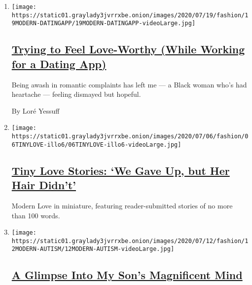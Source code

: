 \begin{enumerate}
\def\labelenumi{\arabic{enumi}.}
\item
  \texttt{[image: https://static01.graylady3jvrrxbe.onion/images/2020/07/19/fashion/19MODERN-DATINGAPP/19MODERN-DATINGAPP-videoLarge.jpg]}

  \hypertarget{trying-to-feel-love-worthy-while-working-for-a-dating-app}{%
  \subsection{\texorpdfstring{\href{/2020/07/17/style/modern-love-feel-love-worthy-working-for-dating-app.html}{Trying
  to Feel Love-Worthy (While Working for a Dating
  App)}}{Trying to Feel Love-Worthy (While Working for a Dating App)}}\label{trying-to-feel-love-worthy-while-working-for-a-dating-app}}

  Being awash in romantic complaints has left me --- a Black woman who's
  had heartache --- feeling dismayed but hopeful.

  By Loré Yessuff
\item
  \texttt{[image: https://static01.graylady3jvrrxbe.onion/images/2020/07/06/fashion/06TINYLOVE-illo6/06TINYLOVE-illo6-videoLarge.jpg]}

  \hypertarget{tiny-love-stories-we-gave-up-but-her-hair-didnt}{%
  \subsection{\texorpdfstring{\href{/2020/07/14/style/tiny-modern-love-stories-coronavirus-we-gave-up-but-her-hair-didnt.html}{Tiny
  Love Stories: `We Gave Up, but Her Hair
  Didn't'}}{Tiny Love Stories: `We Gave Up, but Her Hair Didn't'}}\label{tiny-love-stories-we-gave-up-but-her-hair-didnt}}

  Modern Love in miniature, featuring reader-submitted stories of no
  more than 100 words.
\item
  \texttt{[image: https://static01.graylady3jvrrxbe.onion/images/2020/07/12/fashion/12MODERN-AUTISM/12MODERN-AUTISM-videoLarge.jpg]}

  \hypertarget{a-glimpse-into-my-sons-magnificent-mind}{%
  \subsection{\texorpdfstring{\href{/2020/07/10/style/modern-love-glimpse-into-autistic-sons-magnificent-mind.html}{A
  Glimpse Into My Son's Magnificent
  Mind}}{A Glimpse Into My Son's Magnificent Mind}}\label{a-glimpse-into-my-sons-magnificent-mind}}


\end{enumerate}
